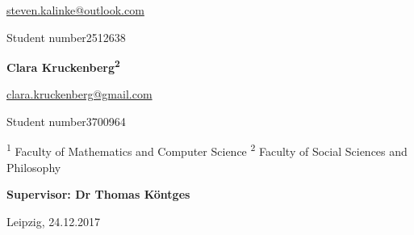 \begin{titlepage}
\begin{center}
\begin{minipage}[t]{.6\textwidth}
		\begin{normalsize}
			\href{mailto:steven.kalinke@outlook.com}{steven.kalinke@outlook.com}
			
			\libertineLF
			{\footnotesize Student number\enspace{}2512638} \vspace*{1cm}
		\end{normalsize}
	\end{minipage}%
	\begin{minipage}[t]{.4\textwidth}
		\large{\textbf{Clara Kruckenberg\textsuperscript{2}}} \vspace*{0.3cm}
		
		\begin{normalsize}
			\href{clara.kruckenberg@gmail.com}{clara.kruckenberg@gmail.com} %
			
			\libertineLF
			{\footnotesize Student number\enspace{}3700964} \vspace*{0.1cm}
		\end{normalsize}
	\end{minipage}


	\end{center}


	\noindent
	{\footnotesize \textsuperscript{1} Faculty of Mathematics and Computer Science \quad{}\textsuperscript{2} Faculty of Social Sciences and Philosophy} \vspace*{1cm}
	
	\noindent
	\textbf{{\large Supervisor: Dr Thomas Köntges}} \vspace*{0.5cm}
	
	\noindent
	{\small Leipzig, 24.12.2017}
	
	
\end{titlepage}